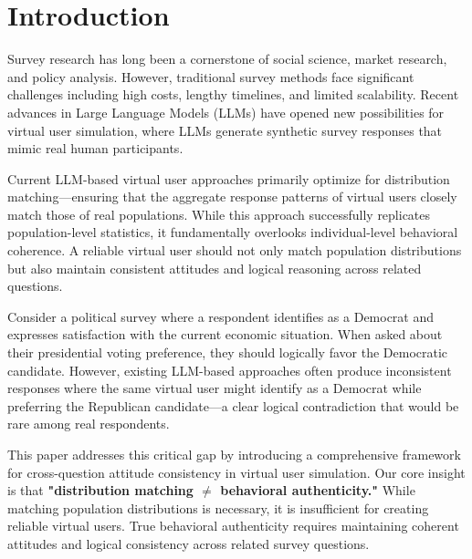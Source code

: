 \documentclass[sigconf, anonymous]{acmart}
\begin{document}

\maketitle

\section{Introduction}

Survey research has long been a cornerstone of social science, market research, and policy analysis. However, traditional survey methods face significant challenges including high costs, lengthy timelines, and limited scalability. Recent advances in Large Language Models (LLMs) have opened new possibilities for virtual user simulation, where LLMs generate synthetic survey responses that mimic real human participants.

Current LLM-based virtual user approaches primarily optimize for distribution matching—ensuring that the aggregate response patterns of virtual users closely match those of real populations. While this approach successfully replicates population-level statistics, it fundamentally overlooks individual-level behavioral coherence. A reliable virtual user should not only match population distributions but also maintain consistent attitudes and logical reasoning across related questions.

Consider a political survey where a respondent identifies as a Democrat and expresses satisfaction with the current economic situation. When asked about their presidential voting preference, they should logically favor the Democratic candidate. However, existing LLM-based approaches often produce inconsistent responses where the same virtual user might identify as a Democrat while preferring the Republican candidate—a clear logical contradiction that would be rare among real respondents.

This paper addresses this critical gap by introducing a comprehensive framework for cross-question attitude consistency in virtual user simulation. Our core insight is that \textbf{"distribution matching $\neq$ behavioral authenticity."} While matching population distributions is necessary, it is insufficient for creating reliable virtual users. True behavioral authenticity requires maintaining coherent attitudes and logical consistency across related survey questions.
\end{document}
